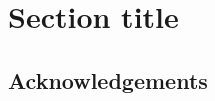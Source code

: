 \documentclass[12pt,a4paper]{article}
\begin{document}
\renewcommand{\thefootnote}{\fnsymbol{footnote}}

\setcounter{page}{1}
\renewcommand{\thefootnote}{\#\arabic{footnote}}
\setcounter{footnote}{0}

\section{Section title}

\subsection*{Acknowledgements}

%
%
\end{document}
